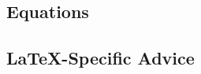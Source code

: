 \documentclass[conference]{IEEEtran}
\def\BibTeX{{\rm B\kern-.05em{\sc i\kern-.025em b}\kern-.08em
    T\kern-.1667em\lower.7ex\hbox{E}\kern-.125emX}}
\begin{document}
\subsection{Equations}
%

\subsection{\LaTeX-Specific Advice}

%
%
%
%
%
%
\end{document}
